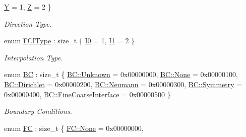 \begin{DoxyCompactItemize}
\hyperlink{namespaceUintah_1_1PhaseField_a94555da848596a419ae2c0e32649e1dcad3de9a09f09605c05790d9f24f329fe5}{Y} = 1, 
\hyperlink{namespaceUintah_1_1PhaseField_a94555da848596a419ae2c0e32649e1dca4865717a7e9eaa5586c1ef9570380d15}{Z} = 2
 \}\begin{DoxyCompactList}\small\item\em Direction Type. \end{DoxyCompactList}
\item 
enum \hyperlink{namespaceUintah_1_1PhaseField_a547ce3002aa97fbd3ef3192a6eec8406}{F\+C\+I\+Type} \+: size\+\_\+t \{ \hyperlink{namespaceUintah_1_1PhaseField_a547ce3002aa97fbd3ef3192a6eec8406abdd8ebcbdfd71d1125937e3012dc45fb}{I0} = 1, 
\hyperlink{namespaceUintah_1_1PhaseField_a547ce3002aa97fbd3ef3192a6eec8406a66f19efe774b0d2b6e5844eb2d83d305}{I1} = 2
 \}\begin{DoxyCompactList}\small\item\em Interpolation Type. \end{DoxyCompactList}
\item 
enum \hyperlink{namespaceUintah_1_1PhaseField_a148fba372aa3be96fd6eede7a2fa10b5}{BC} \+: size\+\_\+t \{ \newline
\hyperlink{namespaceUintah_1_1PhaseField_a148fba372aa3be96fd6eede7a2fa10b5a88183b946cc5f0e8c96b2e66e1c74a7e}{B\+C\+::\+Unknown} = 0x00000000, 
\hyperlink{namespaceUintah_1_1PhaseField_a148fba372aa3be96fd6eede7a2fa10b5a6adf97f83acf6453d4a6a4b1070f3754}{B\+C\+::\+None} = 0x00000100, 
\hyperlink{namespaceUintah_1_1PhaseField_a148fba372aa3be96fd6eede7a2fa10b5abac152b762896edff34ed668ae1a546f}{B\+C\+::\+Dirichlet} = 0x00000200, 
\hyperlink{namespaceUintah_1_1PhaseField_a148fba372aa3be96fd6eede7a2fa10b5ab8537a769dbc90cb1762215441212152}{B\+C\+::\+Neumann} = 0x00000300, 
\newline
\hyperlink{namespaceUintah_1_1PhaseField_a148fba372aa3be96fd6eede7a2fa10b5a020050234b60687bc7753f45e671a0b3}{B\+C\+::\+Symmetry} = 0x00000400, 
\hyperlink{namespaceUintah_1_1PhaseField_a148fba372aa3be96fd6eede7a2fa10b5ad2d89be9637ff8b537fa4b6026c0e574}{B\+C\+::\+Fine\+Coarse\+Interface} = 0x00000500
 \}\begin{DoxyCompactList}\small\item\em Boundary Conditions. \end{DoxyCompactList}
\item 
enum \hyperlink{namespaceUintah_1_1PhaseField_aeb51fe956fe07f1487f5878f4039f27c}{FC} \+: size\+\_\+t \{ \newline
\hyperlink{namespaceUintah_1_1PhaseField_aeb51fe956fe07f1487f5878f4039f27ca6adf97f83acf6453d4a6a4b1070f3754}{F\+C\+::\+None} = 0x00000000, 

\end{DoxyCompactItemize}
